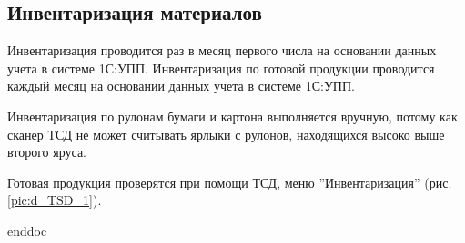%
\subsection{Инвентаризация материалов}

Инвентаризация проводится раз в месяц первого числа на основании данных учета в системе 1С:УПП.
Инвентаризация по готовой продукции проводится каждый месяц на основании данных учета в системе 1С:УПП.

Инвентаризация по рулонам бумаги и картона выполняется вручную, потому как сканер ТСД не может считывать ярлыки с рулонов, находящихся высоко выше второго яруса.

Готовая продукция проверятся при помощи ТСД, меню ''Инвентаризация'' (рис. \ref{pic:d_TSD_1}).


 {enddoc}